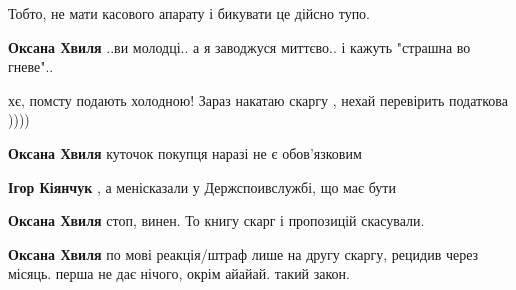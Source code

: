\begin{itemize}
\begin{itemize}
Тобто, не мати касового апарату і бикувати це дійсно тупо.

 
\textbf{Оксана Хвиля} ..ви молодці.. а я заводжуся миттєво.. і кажуть "страшна во гневе"..

 
хє, помсту подають холодною! Зараз накатаю скаргу , нехай перевірить податкова ))))

 
\textbf{Оксана Хвиля} куточок покупця наразі не є обов'язковим

 
\textbf{Ігор Кіянчук} , а менісказали у Держспоивслужбі, що має бути

 
\textbf{Оксана Хвиля} стоп, винен. То книгу скарг і пропозицій скасували.

 
\textbf{Оксана Хвиля} по мові реакція/штраф лише на другу скаргу, рецидив через місяць.
перша не дає нічого, окрім айайай. такий закон.


\end{itemize}
\end{itemize}
